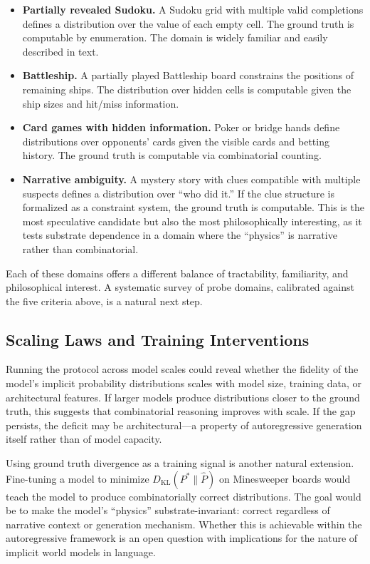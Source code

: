 \documentclass[12pt,a4paper]{article}
\begin{document}
\begin{itemize}[nosep]
    \item \textbf{Partially revealed Sudoku.} A Sudoku grid with multiple valid completions defines a distribution over the value of each empty cell. The ground truth is computable by enumeration. The domain is widely familiar and easily described in text.
    \item \textbf{Battleship.} A partially played Battleship board constrains the positions of remaining ships. The distribution over hidden cells is computable given the ship sizes and hit/miss information.
    \item \textbf{Card games with hidden information.} Poker or bridge hands define distributions over opponents' cards given the visible cards and betting history. The ground truth is computable via combinatorial counting.
    \item \textbf{Narrative ambiguity.} A mystery story with clues compatible with multiple suspects defines a distribution over ``who did it.'' If the clue structure is formalized as a constraint system, the ground truth is computable. This is the most speculative candidate but also the most philosophically interesting, as it tests substrate dependence in a domain where the ``physics'' is narrative rather than combinatorial.
\end{itemize}

Each of these domains offers a different balance of tractability, familiarity, and philosophical interest. A systematic survey of probe domains, calibrated against the five criteria above, is a natural next step.

\subsection{Scaling Laws and Training Interventions}
\label{sec:scaling}

Running the protocol across model scales could reveal whether the fidelity of the model's implicit probability distributions scales with model size, training data, or architectural features. If larger models produce distributions closer to the ground truth, this suggests that combinatorial reasoning improves with scale. If the gap persists, the deficit may be architectural---a property of autoregressive generation itself rather than of model capacity.

Using ground truth divergence as a training signal is another natural extension. Fine-tuning a model to minimize $D_{\mathrm{KL}}(P^* \| \hat{P})$ on Minesweeper boards would teach the model to produce combinatorially correct distributions. The goal would be to make the model's ``physics'' substrate-invariant: correct regardless of narrative context or generation mechanism. Whether this is achievable within the autoregressive framework is an open question with implications for the nature of implicit world models in language.
\end{document}
